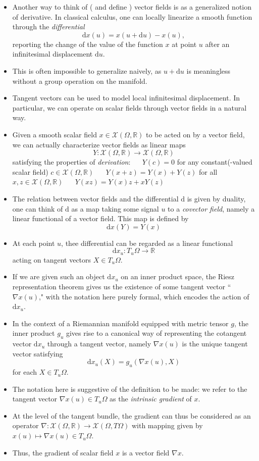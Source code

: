 \documentclass[12pt]{article}
\numberwithin{equation}{section}
\theoremstyle{definition}
\newcommand{		\R		}	{	\mathbb{R}				}
\newcommand{		\cX		}	{	\mathcal{X}				}
\newcommand{		\rd		}	{	\textrm{d}					}
\newcommand{		\Oh		}	{	\Omega					}
\newcommand{		\1		}	{	\bm{1}					}%
\begin{document}
\begin{itemize}

\item Another way to think of ( and define ) vector fields is as a generalized notion of derivative. In classical calculus, one can locally linearize a smooth function through the \emph{differential}
$$
\rd x(u) = x( u + \rd u ) - x(u) ,
$$
reporting the change of the value of the function $x$ at point $u$ after an infinitesimal displacement $\rd u$. 
\item This is often impossible to generalize naively, as $u + \rd u$ is meaningless without a group operation on the manifold. 
\item Tangent vectors can be used to model local infinitesimal displacement. In particular, we can operate on scalar fields through vector fields in a natural way.
\item Given a smooth scalar field $x \in \cX(\Oh,\R)$ to be acted on by a vector field, we can actually characterize vector fields as linear maps
$$
Y : \cX(\Oh,\R) \to \cX (\Oh,\R)
$$ 
satisfying the properties of \emph{derivation}:
 $\quad$ $Y(c) = 0$ for any constant(-valued scalar field) $c \in \cX(\Oh,\R)$
\subitem[ linearity ] $\quad$ $Y(x + z) = Y(x) + Y(z)$ for all $x, z \in \cX(\Oh,\R)$
 $\quad$ $ Y(xz) = Y(x) z + xY(z) $
\item The relation between vector fields and the differential $\rd$ is given by duality, one can think of $\rd$ as a map taking some signal $u$ to a \emph{covector field}, namely a linear functional of a vector field. This map is defined by
$$
\rd x (Y) = Y(x) 
$$ 
\item At each point $u$, thee differential can be regarded as a linear functional 
$$
\rd x_u : T_u\Oh \to \R
$$
acting on tangent vectors $X \in T_u \Oh$. 
\item If we are given such an object $\textrm{d}x_u$ on an inner product space, the Riesz representation theorem gives us the existence of some tangent vector ``$\nabla x(u)$," with the notation here purely formal, which encodes the action of $\textrm{d} x_u$.
\item In the context of a Riemannian manifold equipped with metric tensor $g$, the inner product $g_u$ gives rise to a canonical way of representing the cotangent vector $\textrm{d} x_u$ through a tangent vector, namely $\nabla  x(u)$ is the unique tangent vector satisfying
$$
\rd x_u(X) = g_u(\nabla x(u), X)
$$
for each $X \in T_u \Oh$. 
\item The notation here is suggestive of the definition to be made: we refer to the tangent vector $\nabla x(u) \in T_u\Oh$ as the \emph{intrinsic gradient} of $x$. 
\item At the level of the tangent bundle, the gradient can thus be considered as an operator $\nabla : \cX(\Oh,\R) \to \cX(\Oh, T\Oh)$ with mapping given by $x(u) \mapsto \nabla x(u) \in T_u\Oh$. 
\item Thus, the gradient of scalar field $x$ is a vector field $\nabla x$.
\end{itemize}
\end{document}
